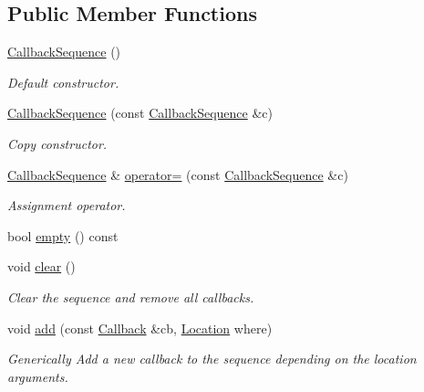 \subsection*{Public Member Functions}
\begin{DoxyCompactItemize}
\item 
\hyperlink{struct_d_d4hep_1_1_callback_sequence_aefd8cccc83fbe0ded44aea01a4da2e77}{Callback\+Sequence} ()
\begin{DoxyCompactList}\small\item\em Default constructor. \end{DoxyCompactList}\item 
\hyperlink{struct_d_d4hep_1_1_callback_sequence_a0ab0fc2e4541f1d9ce38cb3f87c29773}{Callback\+Sequence} (const \hyperlink{struct_d_d4hep_1_1_callback_sequence}{Callback\+Sequence} \&c)
\begin{DoxyCompactList}\small\item\em Copy constructor. \end{DoxyCompactList}\item 
\hyperlink{struct_d_d4hep_1_1_callback_sequence}{Callback\+Sequence} \& \hyperlink{struct_d_d4hep_1_1_callback_sequence_ae72a363494db733a31d47f70564f9ae1}{operator=} (const \hyperlink{struct_d_d4hep_1_1_callback_sequence}{Callback\+Sequence} \&c)
\begin{DoxyCompactList}\small\item\em Assignment operator. \end{DoxyCompactList}\item 
bool \hyperlink{struct_d_d4hep_1_1_callback_sequence_ad8be82cada6e445690231bd157e6087d}{empty} () const
\item 
void \hyperlink{struct_d_d4hep_1_1_callback_sequence_a3a410a493cc8cd2424b70c9dd2f0a7e9}{clear} ()
\begin{DoxyCompactList}\small\item\em Clear the sequence and remove all callbacks. \end{DoxyCompactList}\item 
void \hyperlink{struct_d_d4hep_1_1_callback_sequence_a5941696a51eacc65b1c9221e03e4077d}{add} (const \hyperlink{class_d_d4hep_1_1_callback}{Callback} \&cb, \hyperlink{struct_d_d4hep_1_1_callback_sequence_a7753490247479633aed16a2376821ef7}{Location} where)
\begin{DoxyCompactList}\small\item\em Generically Add a new callback to the sequence depending on the location arguments. \end{DoxyCompactList}\item 

\end{DoxyCompactItemize}
